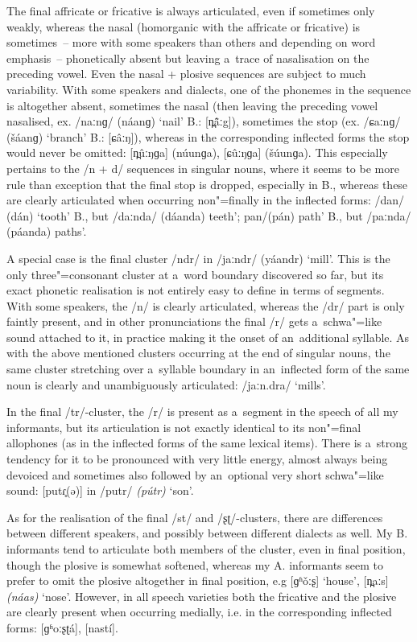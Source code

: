 The final affricate or fricative is always articulated, even if sometimes only weakly, whereas the
nasal (homorganic with the affricate or fricative) is sometimes~-- more with some speakers than
others and depending on word emphasis~-- phonetically absent but leaving a~trace of nasalisation on
the preceding vowel. Even the nasal + plosive sequences are subject to much variability. With some
speakers and dialects, one of the phonemes in the sequence is altogether absent, sometimes the nasal
(then leaving the preceding vowel nasalised, ex. /naːnɡ/
(náanɡ) `nail' B.: [n̪\^{ã}ːg]), sometimes the stop (ex. /ɕaːnɡ/ (\v{s}áanɡ)
`branch' B.: [ɕâːŋ]), whereas in the corresponding inflected forms the stop would never be
omitted: [n̪ûːŋɡa] (núunɡa), [ɕûːŋɡa]
(\v{s}úunɡa). This especially pertains to the /n +
d/ sequences in singular nouns, where it seems to be more rule than exception that the final stop is
dropped, especially in B., whereas these are clearly articulated when occurring non"=finally in the
inflected forms: /dan/ (dán) `tooth' B., but
/daːnda/ (dáanda) teeth'; pan/(pán) path' B., but /paːnda/
(páanda) paths'.


A special case is the final cluster /ndr/ in /jaːndr/ (yáandr) `mill'. This is the only three"=consonant cluster at a~word boundary discovered so far, but its exact phonetic realisation is not entirely easy to define in terms of segments. With some speakers, the /n/ is clearly articulated, whereas the /dr/ part is only faintly present, and in other pronunciations the final /r/ gets a~schwa"=like sound attached to it, in practice making it the onset of an~additional syllable. As with the above mentioned clusters occurring at the end of singular nouns, the same cluster stretching over a~syllable boundary in an~inflected form of the same noun is clearly and unambiguously articulated: /jaːn.dra/ `mills'.


In the final /tr/-cluster, the /r/ is present as a~segment in the speech of all my informants, but its articulation is not exactly identical to its non"=final allophones (as in the inflected forms of the same lexical items). There is a~strong tendency for it to be pronounced with very little energy, almost always being devoiced and sometimes also followed by an~optional very short schwa"=like sound: [putɾ̥(ə)] in /putr/ \textit{(pútr)} `son'. 


As for the realisation of the final /st/ and /ʂʈ/-clusters, there are differences between different speakers, and possibly between different dialects as well. My B. informants tend to articulate both members of the cluster, even in final position, though the plosive is somewhat softened, whereas my A. informants seem to prefer to omit the plosive altogether in final position, e.g [ɡʱ\v{o}ːʂ] `house', [n̪aːs] \textit{(náas)} `nose'. However, in all speech varieties both the fricative and the plosive are clearly present when occurring medially, i.e. in the corresponding inflected forms: [ɡʱoːʂʈá], [nastí].


